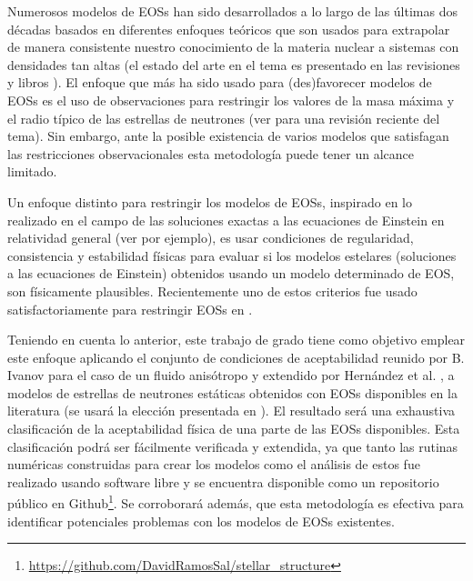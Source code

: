 Numerosos modelos de EOSs han sido desarrollados a lo largo de las últimas dos décadas basados en diferentes enfoques teóricos que son usados para extrapolar de manera consistente nuestro conocimiento de la materia nuclear a sistemas con densidades tan altas (el estado del arte en el tema es presentado en las revisiones \cite{Ozel2016,Oertel2017} y libros \cite{Haensel2007,Rezzolla2018}). El enfoque que más ha sido usado para (des)favorecer modelos de EOSs es el uso de observaciones para restringir los valores de la masa máxima y el radio típico de las estrellas de neutrones (ver \cite{Lattimer2019} para una revisión reciente del tema). Sin embargo, ante la posible existencia de varios modelos que satisfagan las restricciones observacionales esta metodología puede tener un alcance limitado.   

Un enfoque distinto para restringir los modelos de EOSs, inspirado en lo realizado en el campo de las soluciones exactas a las ecuaciones de Einstein en relatividad general (ver \cite{Delgaty1998} por ejemplo), es usar condiciones de regularidad, consistencia y estabilidad físicas para evaluar si los modelos estelares (soluciones a las ecuaciones de Einstein) obtenidos usando un modelo determinado de EOS, son físicamente plausibles. Recientemente uno de estos criterios fue usado satisfactoriamente para restringir EOSs en \cite{Koliogiannis2019a}.

Teniendo en cuenta lo anterior, este trabajo de grado tiene como objetivo emplear este enfoque aplicando el conjunto de condiciones de aceptabilidad reunido por B. Ivanov \cite{Ivanov2017} para el caso de un fluido anisótropo y extendido por Hernández et al. \cite{Hernandez2018}, a modelos de estrellas de neutrones estáticas obtenidos con EOSs disponibles en la literatura (se usará la elección presentada en \cite{Ozel2016}). El resultado será una exhaustiva clasificación de la aceptabilidad física de una parte de las EOSs disponibles. Esta clasificación podrá ser fácilmente verificada y extendida, ya que tanto las rutinas numéricas construidas para crear los modelos como el análisis de estos fue realizado usando software libre y se encuentra disponible como un repositorio público en Github\footnote{\url{https://github.com/DavidRamosSal/stellar_structure}}. Se corroborará además, que esta metodología es efectiva para identificar potenciales problemas con los modelos de EOSs existentes. 

